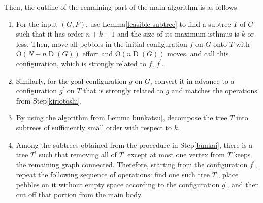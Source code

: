 \documentclass[letter,11pt]{article}
\theoremstyle{definition}
\theoremstyle{definition}
\DeclareMathOperator{\D}{D}
\newcommand{\1}{\boldmath$~1~$\unboldmath}
\newcommand{\Ord}{\mathrm{O}}
\newcommand{\tume}{\hspace*{0.2em}}
\begin{document}
Then, the outline of the remaining part of the main algorithm is as follows:
\begin{enumerate}
\item{For the input $(G,P)$, use Lemma\tume\ref{feasible-subtree} to find a subtree $T$ of $G$ such that it has order $n+k+1$ and the size of its maximum isthmus is $k$ or less. Then, move all pebbles in the initial configuration $f$ on $G$ onto $T$ with $\Ord(N+n\D(G))$ effort and $\Ord(n\D(G))$ moves, and call this configuration, which is strongly related to $f$, $f^{\prime}$.}
\item{Similarly, for the goal configuration $g$ on $G$, convert it in advance to a configuration $g^{\prime}$ on $T$ that is strongly related to $g$ and matches the operations from Step\tume\ref{kiriotoshi}.
}
\item{By using the algorithm from Lemma\tume\ref{bunkatsu}, decompose the tree $T$ into subtrees of sufficiently small order with respect to $k$.
}\label{bunkai}
\item{
Among the subtrees obtained from the procedure in Step\tume\ref{bunkai}, there is a tree $T^{\prime}$ such that removing all of $T^{\prime}$ except at most one vertex from $T$ keeps the remaining graph connected. Therefore, starting from the configuration $f^{\prime}$, repeat the following sequence of operations: find one such tree $T^{\prime}$, place pebbles on it without empty space according to the configuration $g^{\prime}$, and then cut off that portion from the main body. 
}\label{kiriotoshi}
\end{enumerate}
\end{document}
